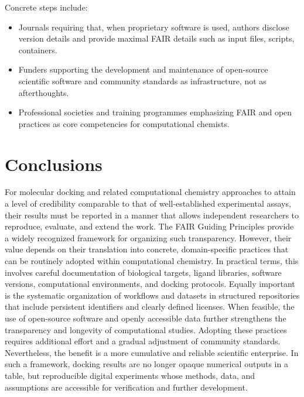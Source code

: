\documentclass[12pt]{article}
\begin{document}
Concrete steps include:

\begin{itemize}
  \item Journals requiring that, when proprietary software is used, authors disclose version details and provide maximal FAIR details such as input files, scripts, containers.
  \item Funders supporting the development and maintenance of open-source scientific software and community standards as infrastructure, not as afterthoughts.
  \item Professional societies and training programmes emphasizing FAIR and open practices as core competencies for computational chemists.
\end{itemize}

\section{Conclusions}

For molecular docking and related computational chemistry approaches to attain a level of credibility comparable to that of well-established experimental assays, their results must be reported in a manner that allows independent researchers to reproduce, evaluate, and extend the work. The FAIR Guiding Principles provide a widely recognized framework for organizing such transparency. However, their value depends on their translation into concrete, domain-specific practices that can be routinely adopted within computational chemistry. In practical terms, this involves careful documentation of biological targets, ligand libraries, software versions, computational environments, and docking protocols. Equally important is the systematic organization of workflows and datasets in structured repositories that include persistent identifiers and clearly defined licenses. When feasible, the use of open-source software and openly accessible data further strengthens the transparency and longevity of computational studies. Adopting these practices requires additional effort and a gradual adjustment of community standards. Nevertheless, the benefit is a more cumulative and reliable scientific enterprise. In such a framework, docking results are no longer opaque numerical outputs in a table, but reproducible digital experiments whose methods, data, and assumptions are accessible for verification and further development.



\end{document}
